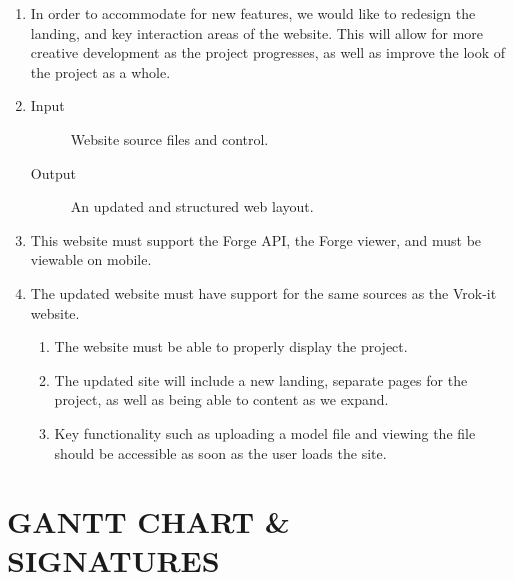 \documentclass[letterpaper, 10pt, draftclsnofoot, compsoc, onecolumn]{IEEEtran}
\begin{document}
\begin{enumerate}
	\item In order to accommodate for new features, we would like to redesign the landing, and key interaction areas of the website. 
	This will allow for more creative development as the project progresses, as well as improve the look of the project as a whole.

	\item
	\begin{description}
	\item [Input] Website source files and control. 
	
	\item [Output] An updated and structured web layout.
	\end{description}

	\item This website must support the Forge API, the Forge viewer, and must be viewable on mobile. 

	\item The updated website must have support for the same sources as the Vrok-it website.

	\begin{enumerate}
		\item The website must be able to properly display the project. 
		\item The updated site will include a new landing, separate pages for the project, as well as being able to content as we expand. 
		\item Key functionality such as uploading a model file and viewing the file should be accessible as soon as the user loads the site.
	\end{enumerate}
\end{enumerate}

\clearpage
\section[GANTT CHART/SIGNATURES]{\rmfamily\bfseries\color{black}
GANTT CHART \& SIGNATURES}


	
\end{document}
